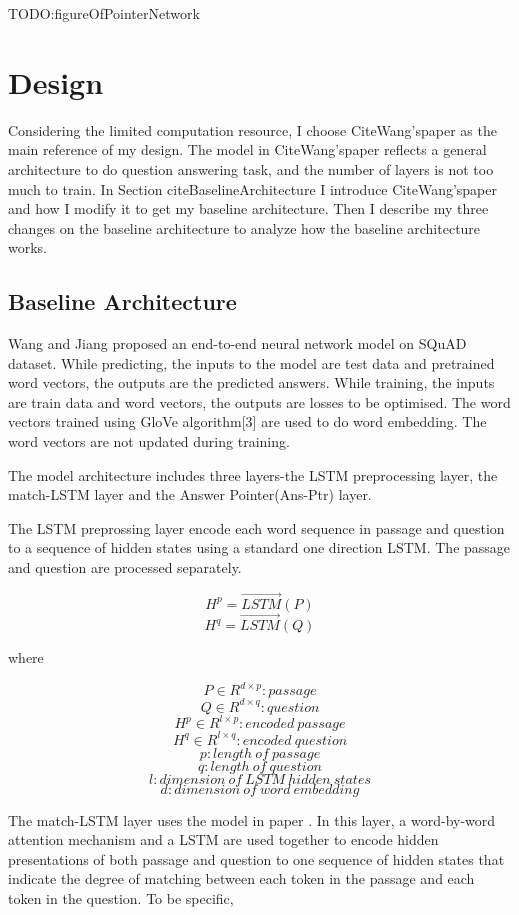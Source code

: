 \documentclass[modernstyle,12pt]{sjsuthesis}
\theoremstyle{definition}
\begin{document}
TODO:figureOfPointerNetwork




\chapter{Design}

Considering the limited computation resource, I choose CiteWang'spaper as the main reference of my design. The model in CiteWang'spaper reflects a general architecture to do question answering task, and the number of layers is not too much to train. In Section citeBaselineArchitecture I introduce CiteWang'spaper and how I modify it to get my baseline architecture. Then I describe my three changes on the baseline architecture to analyze how the baseline architecture works.

\section{Baseline Architecture}

Wang and Jiang proposed an end-to-end neural network model on SQuAD dataset. While predicting, the inputs to the model are test data and pretrained word vectors, the outputs are the predicted answers. While training, the inputs are train data and word vectors, the outputs are losses to be optimised. The word vectors trained using GloVe algorithm[3] are used to do word embedding. The word vectors are not updated during training.

The model architecture includes three layers-the LSTM preprocessing layer, the match-LSTM layer and the Answer Pointer(Ans-Ptr) layer.

The LSTM preprossing layer encode each word sequence in passage and question to a sequence of hidden states using a standard one direction LSTM. The passage and question are processed separately.

$$H^p = \overrightarrow{LSTM}(P)$$
$$H^q = \overrightarrow{LSTM}(Q)$$

where

 $$P\in R^{d \times p}: passage$$
 $$Q\in R^{d \times q}: question$$
 $$H^p\in R^{l \times p}: encoded\ passage$$
 $$H^q\in R^{l \times q}: encoded\ question$$
 $$p: length \ of\ passage$$
 $$q: length\ of\ question$$
 $$l: dimension\ of\ LSTM\ hidden\ states$$
 $$d: dimension\ of\ word\ embedding$$

The match-LSTM layer uses the model in paper \cite{wang2015learning}. In this layer, a word-by-word attention mechanism and a LSTM are used together to encode hidden presentations of both passage and question to one sequence of hidden states that indicate the degree of matching between each token in the passage and each token in the question. To be specific,
\end{document}
